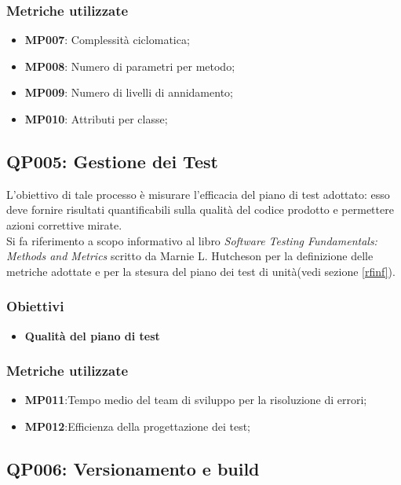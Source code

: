 \subsubsection{Metriche utilizzate}

\begin{itemize}
	\item \textbf{MP007}: Complessità ciclomatica;
	\item \textbf{MP008}: Numero di parametri per metodo;
	\item \textbf{MP009}: Numero di livelli di annidamento;
	\item \textbf{MP010}: Attributi per classe;
	
	
\end{itemize}

\subsection{QP005: Gestione dei Test}\label{test}
L'obiettivo di tale processo è misurare l'efficacia del piano di test adottato: esso deve fornire risultati quantificabili sulla qualità del codice prodotto e permettere azioni correttive mirate.\\
Si fa riferimento a scopo informativo al libro \textit{Software Testing Fundamentals: Methods and Metrics} scritto da Marnie L. Hutcheson per la definizione delle metriche adottate e per la stesura del piano dei test di unità(vedi sezione \ref{rfinf}).
\subsubsection{Obiettivi}
\begin{itemize}
	\item \textbf{Qualità del piano di test} 
\end{itemize}
\subsubsection{Metriche utilizzate}
\begin{itemize}
	\item \textbf{MP011}:Tempo medio del team di sviluppo per la risoluzione di errori;
	\item \textbf{MP012}:Efficienza della progettazione dei test;
\end{itemize}


\subsection{QP006: Versionamento e build}
